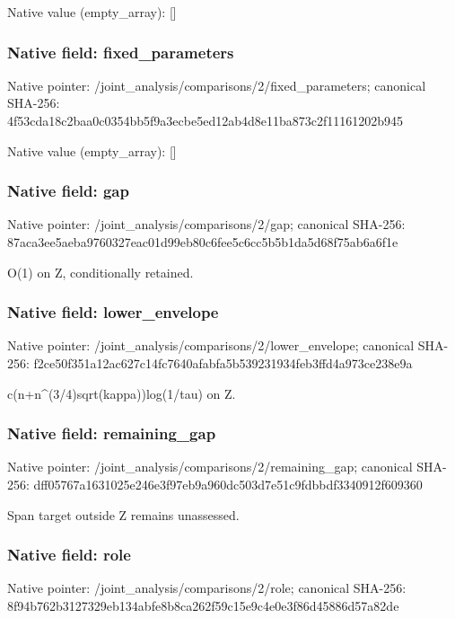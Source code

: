 \documentclass[10pt,a4paper]{article}
\begin{document}
Native value (empty\_\allowbreak{}array): []

\subsubsection{Native field: fixed\_\allowbreak{}parameters}
Native pointer: /joint\_\allowbreak{}analysis/comparisons/2/fixed\_\allowbreak{}parameters; canonical SHA-256: 4f53cda18c2baa0c0354bb5f9a3ecbe5ed12ab4d8e11ba873c2f11161202b945

Native value (empty\_\allowbreak{}array): []

\subsubsection{Native field: gap}
Native pointer: /joint\_\allowbreak{}analysis/comparisons/2/gap; canonical SHA-256: 87aca3ee5aeba9760327eac01d99eb80c6fee5c6cc5b5b1da5d68f75ab6a6f1e

\begingroup\raggedright\sloppy O(1) on Z,\allowbreak{} conditionally retained.\par\endgroup

\subsubsection{Native field: lower\_\allowbreak{}envelope}
Native pointer: /joint\_\allowbreak{}analysis/comparisons/2/lower\_\allowbreak{}envelope; canonical SHA-256: f2ce50f351a12ac627c14fc7640afabfa5b539231934feb3ffd4a973ce238e9a

\begingroup\raggedright\sloppy c(n+n\textasciicircum{}(3/\allowbreak{}4)sqrt(kappa))log(1/\allowbreak{}tau) on Z.\par\endgroup

\subsubsection{Native field: remaining\_\allowbreak{}gap}
Native pointer: /joint\_\allowbreak{}analysis/comparisons/2/remaining\_\allowbreak{}gap; canonical SHA-256: dff05767a1631025e246e3f97eb9a960dc503d7e51c9fdbbdf3340912f609360

\begingroup\raggedright\sloppy Span target outside Z remains unassessed.\par\endgroup

\subsubsection{Native field: role}
Native pointer: /joint\_\allowbreak{}analysis/comparisons/2/role; canonical SHA-256: 8f94b762b3127329eb134abfe8b8ca262f59c15e9c4e0e3f86d45886d57a82de
\end{document}
